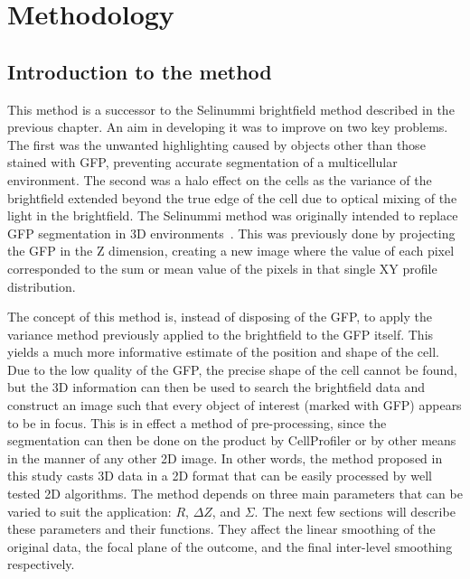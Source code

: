 
\chapter{Methodology}

\ifpdf
    \graphicspath{{Chapter4/Figs/Raster/}{Chapter4/Figs/PDF/}{Chapter4/Figs/}}
\else
    \graphicspath{{Chapter4/Figs/Vector/}{Chapter4/Figs/}}
\fi

\section{Introduction to the method}

This method is a successor to the Selinummi brightfield method described in the previous chapter. An aim in developing it was to improve on two key problems. The first was the unwanted highlighting caused by objects other than those stained with GFP, preventing accurate segmentation of a multicellular environment. The second was a halo effect on the cells as the variance of the brightfield extended beyond the true edge of the cell due to optical mixing of the light in the brightfield. The Selinummi method was originally intended to replace GFP segmentation in 3D environments~\cite{Selinummi:09}. This was previously done by projecting the GFP in the Z dimension, creating a new image where the value of each pixel corresponded to the sum or mean value of the pixels in that single XY profile distribution.

The concept of this method is, instead of disposing of the GFP, to apply the variance method previously applied to the brightfield to the GFP itself. This yields a much more informative estimate of the position and shape of the cell. Due to the low quality of the GFP, the precise shape of the cell cannot be found, but the 3D information can then be used to search the brightfield data and construct an image such that every object of interest (marked with GFP) appears to be in focus. This is in effect a method of pre-processing, since the segmentation can then be done on the product by CellProfiler or by other means in the manner of any other 2D image. In other words, the method proposed in this study casts 3D data in a 2D format that can be easily processed by well tested 2D algorithms. The method depends on three main parameters that can be varied to suit the application: $R$, $\Delta Z$, and $\Sigma$. The next few sections will describe these parameters and their functions. They affect the linear smoothing of the original data, the focal plane of the outcome, and the final inter-level smoothing respectively.

